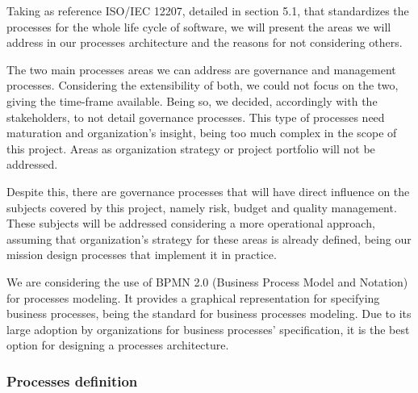 Taking as reference ISO/IEC 12207, detailed in section 5.1, that standardizes the processes for the whole life cycle of software, we will present the areas we will address in our processes architecture and the reasons for not considering others.\par
The two main processes areas we can address are governance and management processes. Considering the extensibility of both, we could not focus on the two, giving the time-frame available. Being so, we decided, accordingly with the stakeholders, to not detail governance processes. This type of processes need maturation and organization's insight, being too much complex in the scope of this project. Areas as organization strategy or project portfolio will not be addressed.\par 
Despite this, there are governance processes that will have direct influence on the subjects covered by this project, namely risk, budget and quality management. These subjects will be addressed considering a more operational approach, assuming that organization's strategy for these areas is already defined, being our mission design processes that implement it in practice.\par
We are considering the use of BPMN 2.0 (Business Process Model and Notation) for processes modeling. It provides a graphical representation for specifying business processes, being the standard for business processes modeling. Due to its large adoption by organizations for business processes' specification, it is the best option for designing a processes architecture. \par


\subsubsection{Processes definition}

